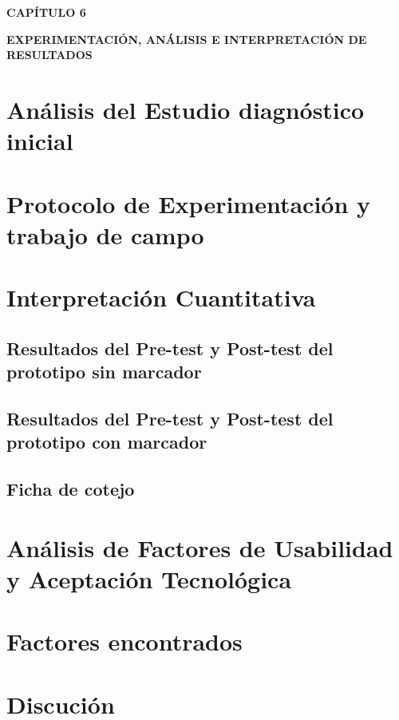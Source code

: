 \setcounter{chapter}{6}
\setcounter{section}{0} 
{\centering
{\large\bfseries CAPÍTULO 6}\par\vspace{0.3cm}
{\Large\bfseries EXPERIMENTACIÓN, ANÁLISIS E INTERPRETACIÓN DE RESULTADOS}\par}
\vspace{1cm}

\section{Análisis del Estudio diagnóstico inicial}
\section{Protocolo de Experimentación y trabajo de campo}
\section{Interpretación Cuantitativa}
\subsection{Resultados del Pre-test y Post-test del prototipo sin marcador}
\subsection{Resultados del Pre-test y Post-test del prototipo con marcador}
\subsection{Ficha de cotejo}
\section{Análisis de Factores de Usabilidad y Aceptación Tecnológica}
\section{Factores encontrados}
\section{Discución}
